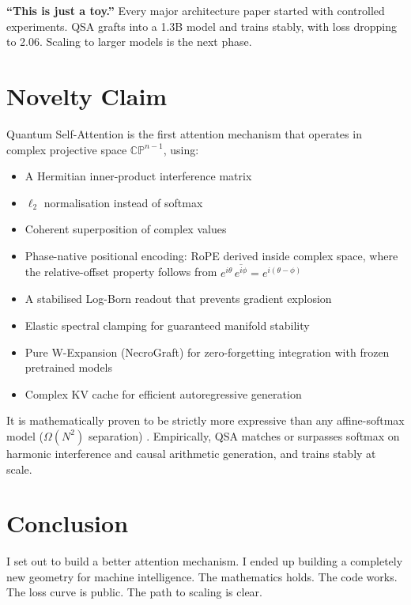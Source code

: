 \documentclass[11pt]{article}
\begin{document}
\textbf{``This is just a toy.''}
Every major architecture paper started with controlled experiments. QSA grafts into a 1.3B model and trains stably, with loss dropping to 2.06. Scaling to larger models is the next phase.

\section{Novelty Claim}

Quantum Self-Attention is the first attention mechanism that operates in complex projective space \(\mathbb{C}\mathbb{P}^{n-1}\), using:
\begin{itemize}
    \item A Hermitian inner-product interference matrix
    \item \(\ell_2\) normalisation instead of softmax
    \item Coherent superposition of complex values
    \item Phase-native positional encoding: RoPE derived inside complex space, where the relative-offset property follows from \(e^{i\theta}\,\overline{e^{i\phi}} = e^{i(\theta-\phi)}\)
    \item A stabilised Log-Born readout that prevents gradient explosion
    \item Elastic spectral clamping for guaranteed manifold stability
    \item Pure W-Expansion (NecroGraft) for zero-forgetting integration with frozen pretrained models
    \item Complex KV cache for efficient autoregressive generation
\end{itemize}

It is mathematically proven to be strictly more expressive than any affine-softmax model (\(\Omega(N^2)\) separation) \cite{nebli2026}. Empirically, QSA matches or surpasses softmax on harmonic interference and causal arithmetic generation, and trains stably at scale.

\section{Conclusion}

I set out to build a better attention mechanism. I ended up building a completely new geometry for machine intelligence. The mathematics holds. The code works. The loss curve is public. The path to scaling is clear.
\end{document}
